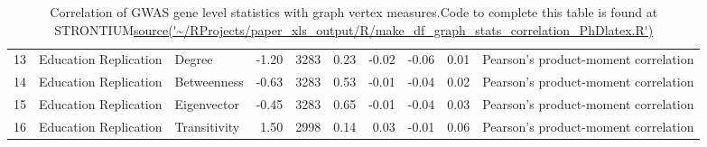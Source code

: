 \begin{table}[ht]
\begin{adjustbox}{max width=\textwidth}
\begin{tabular}{rllrlrrrrl}
  13 & Education Replication & Degree & -1.20 & 3283 & 0.23 & -0.02 & -0.06 & 0.01 & Pearson's product-moment correlation \\ 
  14 & Education Replication & Betweenness & -0.63 & 3283 & 0.53 & -0.01 & -0.04 & 0.02 & Pearson's product-moment correlation \\ 
  15 & Education Replication & Eigenvector & -0.45 & 3283 & 0.65 & -0.01 & -0.04 & 0.03 & Pearson's product-moment correlation \\ 
  16 & Education Replication & Transitivity & 1.50 & 2998 & 0.14 & 0.03 & -0.01 & 0.06 & Pearson's product-moment correlation \\ 
   \hline
\end{tabular}
\end{adjustbox}
\caption{Correlation of GWAS gene level statistics with graph vertex measures.Code to complete this table is found at STRONTIUM\url{source('~/RProjects/paper_xls_output/R/make_df_graph_stats_correlation_PhDlatex.R')}}
\label{Table:Correlation of GWAS gene level statistics with graph vertex measures}
\end{table}

